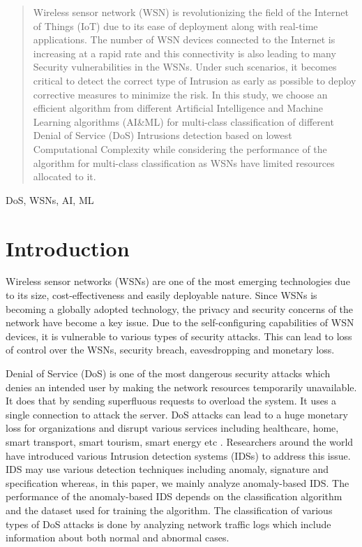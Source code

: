 \documentclass[conference]{IEEEtran}
\begin{document}
\begin{abstract}
Wireless sensor network (WSN) is revolutionizing the field of the Internet of Things (IoT) due to its ease of deployment along with real-time applications. The number of WSN devices connected to the Internet is increasing at a rapid rate and this connectivity is also leading to many Security vulnerabilities in the WSNs. Under such scenarios, it becomes critical to detect the correct type of Intrusion as early as possible to deploy corrective measures to minimize the risk. In this study, we choose an efficient algorithm from different Artificial Intelligence and Machine Learning algorithms (AI\&ML) for multi-class classification of different Denial of Service (DoS) Intrusions detection based on lowest Computational Complexity while considering the performance of the algorithm for multi-class classification as WSNs have limited resources allocated to it.    
\end{abstract}

\begin{IEEEkeywords}
DoS, WSNs, AI, ML\end{IEEEkeywords}

\section{Introduction}
Wireless sensor networks (WSNs) are one of the most emerging technologies due to its size, cost-effectiveness and easily deployable nature. Since WSNs is becoming a globally adopted technology, the privacy and security concerns of the network have become a key issue. Due to the self-configuring capabilities of WSN devices, it is vulnerable to various types of security attacks. This can lead to loss of control over the WSNs, security breach, eavesdropping and monetary loss. 

Denial of Service (DoS) is one of the most dangerous security attacks which denies an intended user by making the network resources temporarily unavailable. It does that by sending superfluous requests to overload the system. It uses a single connection to attack the server. DoS attacks can lead to a huge monetary loss for organizations and disrupt various services including healthcare, home, smart transport, smart tourism, smart energy etc \cite{li2011smart}. Researchers around the world have introduced various Intrusion detection systems (IDSs) to address this issue. IDS may use various detection techniques including anomaly, signature and specification whereas, in this paper, we mainly analyze anomaly-based IDS. The performance of the anomaly-based IDS depends on the classification algorithm and the dataset used for training the algorithm. The classification of various types of DoS attacks is done by analyzing network traffic logs which include information about both normal and abnormal cases. 
\end{document}
